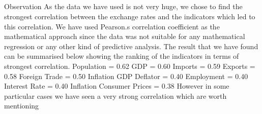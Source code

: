 \subsection{}{Observation}
As the data we have used is not very huge, we chose to find the strongest correlation between the exchange rates and the indicators which led to this correlation. We have used Pearson.s correlation coefficient as the mathematical approach since the data was not suitable for any mathematical regression or any other kind of predictive analysis. The result that we have found can be summarised below showing the ranking of the indicators in terms of strongest correlation.
\newline
Population = 0.62\newline
GDP = 0.60\newline
Imports = 0.59\newline
Exports = 0.58\newline
Foreign Trade = 0.50\newline
Inflation GDP Deflator = 0.40\newline
Employment = 0.40\newline
Interest Rate = 0.40\newline
Inflation Consumer Prices = 0.38\newline
However in some particular cases we have seen a very strong correlation which are worth mentioning
